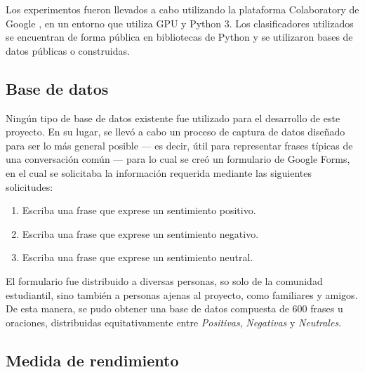 \documentclass[conference]{IEEEtran}
\begin{document}
    Los experimentos fueron llevados a cabo utilizando la plataforma Colaboratory de Google \cite{colaboratory}, en un entorno que utiliza GPU y Python 3. Los clasificadores utilizados se encuentran de forma pública en bibliotecas de Python y se utilizaron bases de datos públicas o construidas.
    
    
    \subsection{Base de datos}
    
        Ningún tipo de base de datos existente fue utilizado para el desarrollo de este proyecto. En su lugar, se llevó a cabo un proceso de captura de datos diseñado para ser lo más general posible --- es decir, útil para representar frases típicas de una conversación común --- para lo cual se creó un formulario de Google Forms, en el cual se solicitaba la información requerida mediante las siguientes solicitudes:
        
        \begin{enumerate}
            \item Escriba una frase que exprese un sentimiento positivo.
            
            \item Escriba una frase que exprese un sentimiento negativo.
            
            \item Escriba una frase que exprese un sentimiento neutral.
        \end{enumerate}
    
        El formulario fue distribuido a diversas personas, so solo de la comunidad estudiantil, sino también a personas ajenas al proyecto, como familiares y amigos. De esta manera, se pudo obtener una base de datos compuesta de 600 frases u oraciones, distribuidas equitativamente entre \textit{Positivas}, \textit{Negativas} y \textit{Neutrales}.
    
    
    
    
    \subsection{Medida de rendimiento}
    
\end{document}
